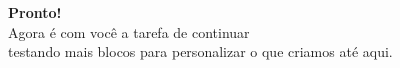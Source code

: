 \documentclass[11pt,fleqn]{book} %
\begin{document}
\begin{center}
\textbf{Pronto!}\\ Agora é com você a tarefa de continuar\\ testando mais blocos para personalizar o que criamos até aqui.
\end{center}







\end{document}
